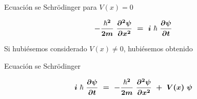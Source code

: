 \vspace{5mm}
\begin{myblock}{Ecuación se Schrödinger para $V(x)=0$}
	
\begin{equation}
\boldsymbol{
 -\dfrac{\hbar^2}{2m} \ \pdv[2]{\psi}{x} \ = \ i\ \hbar \ \pdv{\psi}{t}
 }
\end{equation}

\end{myblock}

\vspace{5mm}
Si hubiésemos considerado $V(x) \neq 0$, hubiésemos obtenido

\vspace{5mm}
\begin{myblock}{Ecuación se Schrödinger}
	
\begin{equation}
\boldsymbol{
i\ \hbar \ \pdv{\psi}{t} \ = \  -\dfrac{\hbar^2}{2m} \ \pdv[2]{\psi}{x}  \ + \ V(x) \ \psi
 }
\end{equation}

\end{myblock}

















